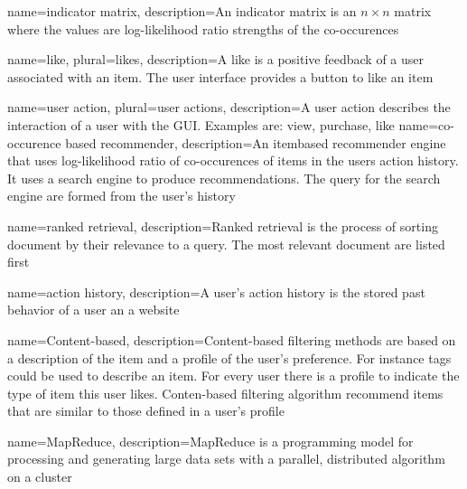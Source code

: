 {
name={indicator matrix},
description={An indicator matrix is an $n \times n$ matrix where the values are log-likelihood ratio strengths of the co-occurences}
}

{
name={like},
plural={likes},
description={A like is a positive feedback of a user associated with an item. The user interface provides a button to like an item}
}

{
name={user action},
plural={user actions},
description={A user action describes the interaction of a user with the GUI. Examples are: view, purchase, like }
}
{
name={co-occurence based recommender},
description={An itembased recommender engine that uses log-likelihood ratio of co-occurences of items in the users action history. It uses a search engine to produce recommendations. The query for the search engine are formed from the user's history }
}

{
name={ranked retrieval},
description={Ranked retrieval is the process of sorting document by their relevance to a query. The most relevant document are listed first}
}

{
name={action history},
description={A user's action history is the stored past behavior of a user an a website}
}

{
name={Content-based},
description={Content-based filtering methods are based on a description of the item and a profile of the user’s preference. For instance tags could be used to describe an item. For every user there is a profile to indicate the type of item this user likes. Conten-based filtering algorithm recommend items that are similar to those defined in a user's profile}
}

{
name={MapReduce},
description={MapReduce is a programming model for processing and generating large data sets with a parallel, distributed algorithm on a cluster}
}
